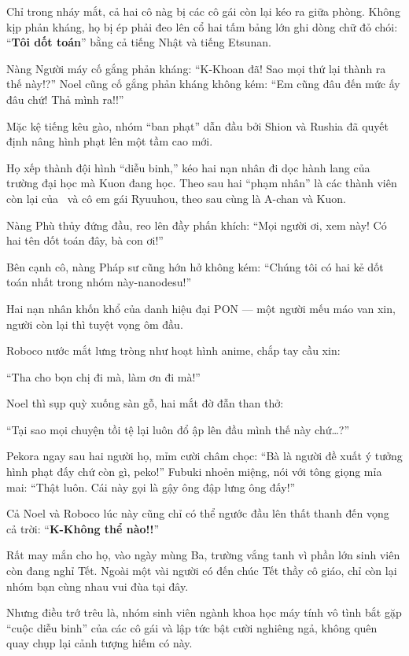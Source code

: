 \documentclass[../main.tex]{subfiles}
\begin{document}
\ct

Chỉ trong nháy mắt, cả hai cô nàg bị các cô gái còn lại kéo ra giữa phòng. Không kịp phản kháng, họ bị ép phải đeo lên cổ hai tấm bảng lớn ghi dòng chữ đỏ chói: ``\textbf{Tôi dốt toán}'' bằng cả tiếng Nhật và tiếng Etsunan.

Nàng Người máy cố gắng phản kháng: ``K-Khoan đã! Sao mọi thứ lại thành ra thế này!?'' Noel cũng cố gắng phản kháng không kém: ``Em cũng đâu đến mức ấy đâu chứ! Thả mình ra!!''

Mặc kệ tiếng kêu gào, nhóm ``ban phạt'' dẫn đầu bởi Shion và Rushia đã quyết định nâng hình phạt lên một tầm cao mới.

Họ xếp thành đội hình ``diễu binh,'' kéo hai nạn nhân đi dọc hành lang của trường đại học mà Kuon đang học. Theo sau hai ``phạm nhân'' là các thành viên còn lại của \hll\ và cô em gái Ryuuhou, theo sau cùng là A-chan và Kuon.

Nàng Phù thủy đứng đầu, reo lên đầy phấn khích: ``Mọi người ơi, xem này! Có hai tên dốt toán đây, bà con ơi!''

Bên cạnh cô, nàng Pháp sư cũng hớn hở không kém: ``Chúng tôi có hai kẻ dốt toán nhất trong nhóm này-nanodesu!''

Hai nạn nhân khốn khổ của danh hiệu đại PON --- một người mếu máo van xin, người còn lại thì tuyệt vọng ôm đầu.

Roboco nước mắt lưng tròng như hoạt hình anime, chắp tay cầu xin:

``Tha cho bọn chị đi mà, làm ơn đi mà!''

Noel thì sụp quỳ xuống sàn gỗ, hai mắt đờ đẫn than thở:

``Tại sao mọi chuyện tồi tệ lại luôn đổ ập lên đầu mình thế này chứ\dots?''

Pekora ngay sau hai người họ, mỉm cười châm chọc: ``Bà là người đề xuất ý tưởng hình phạt đấy chứ còn gì, peko!'' Fubuki nhoẻn miệng, nói với tông giọng mỉa mai: ``Thật luôn. Cái này gọi là gậy ông đập lưng ông đấy!''

Cả Noel và Roboco lúc này cũng chỉ có thể ngước đầu lên thất thanh đến vọng cả trời: ``\textbf{K-Không thể nào!!}''

Rất may mắn cho họ, vào ngày mùng Ba, trường vắng tanh vì phần lớn sinh viên còn đang nghỉ Tết. Ngoài một vài người có đến chúc Tết thầy cô giáo, chỉ còn lại nhóm bạn cùng nhau vui đùa tại đây.

Nhưng điều trớ trêu là, nhóm sinh viên ngành khoa học máy tính vô tình bắt gặp ``cuộc diễu binh'' của các cô gái và lập tức bật cười nghiêng ngả, không quên quay chụp lại cảnh tượng hiếm có này.
\end{document}
